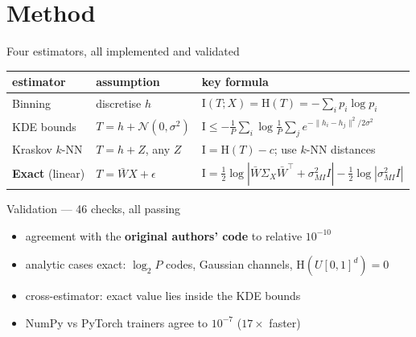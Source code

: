 \documentclass[aspectratio=169,11pt]{beamer}
\newcommand{\I}{\mathrm{I}}
\newcommand{\HH}{\mathrm{H}}
\newcommand{\Norm}{\mathcal{N}}
\newcommand{\Wb}{\bar{W}}
\newcommand{\smi}{\sigma_{MI}}
\begin{document}
\section{Method}

\begin{frame}{Four estimators, all implemented and validated}
\footnotesize
\begin{tabular}{@{}llp{4.6cm}@{}}
\toprule
\textbf{estimator} & \textbf{assumption} & \textbf{key formula} \\
\midrule
Binning & discretise $h$ & $\I(T;X)=\HH(T)=-\sum_i p_i\log p_i$ \\[3pt]
KDE bounds & $T=h+\Norm(0,\sigma^2)$ &
  $\I \le -\frac1P\sum_i\log\frac1P\sum_j e^{-\|h_i-h_j\|^2/2\sigma^2}$ \\[3pt]
Kraskov $k$-NN & $T=h+Z$, any $Z$ & $\I = \HH(T)-c$; use $k$-NN distances \\[3pt]
\textbf{Exact} (linear) & $T=\Wb X+\epsilon$ &
  $\I=\frac12\log|\Wb\Sigma_X\Wb^\top+\smi^2 I|-\frac12\log|\smi^2 I|$ \\
\bottomrule
\end{tabular}
\medskip
\begin{block}{\small Validation --- 46 checks, all passing}
\begin{itemize}\footnotesize
  \item agreement with the \textbf{original authors' code} to relative $10^{-10}$
  \item analytic cases exact: $\log_2 P$ codes, Gaussian channels, $\HH(U[0,1]^d)=0$
  \item cross-estimator: exact value lies inside the KDE bounds
  \item NumPy vs PyTorch trainers agree to $10^{-7}$ ($17\times$ faster)
\end{itemize}
\end{block}
\end{frame}
\end{document}
